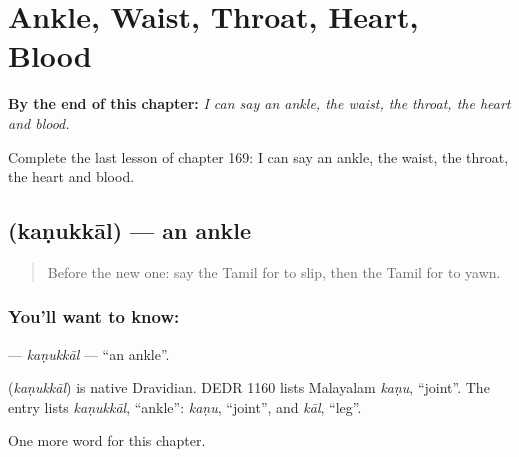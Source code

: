 
\chapter{Ankle, Waist, Throat, Heart, Blood}
\label{ch:ta-ankle-waist-throat-heart-blood}

\begin{chapteropening}
\textbf{By the end of this chapter:} \emph{I can say an ankle, the waist, the throat, the heart and blood.}

Complete the last lesson of chapter 169: I can say an ankle, the waist, the throat, the heart and blood.
\end{chapteropening}

\section[\texorpdfstring{\ta{கணுக்கால்} (kaṇukkāl)}{கணுக்கால் (kaṇukkāl)}]{ (kaṇukkāl) — an ankle}

\label{lesson:TA-C169-kanukkal}



\begin{quote}
Before the new one: say the Tamil for to slip, then the Tamil for to yawn.
\end{quote}

\subsection*{You'll want to know: }
\textbf{} — \emph{kaṇukkāl} — \textquotedblleft{}an ankle\textquotedblright{}.

\begin{cousinweb}
\textbf{} (\emph{kaṇukkāl}) is native Dravidian. DEDR 1160 lists Malayalam \emph{kaṇu}, \textquotedblleft{}joint\textquotedblright{}. The entry lists \emph{kaṇukkāl}, \textquotedblleft{}ankle\textquotedblright{}: \emph{kaṇu}, \textquotedblleft{}joint\textquotedblright{}, and \emph{kāl}, \textquotedblleft{}leg\textquotedblright{}.
\end{cousinweb}

\begin{grammarlens}[title={What you've built}]
One more word for this chapter.
\end{grammarlens}

